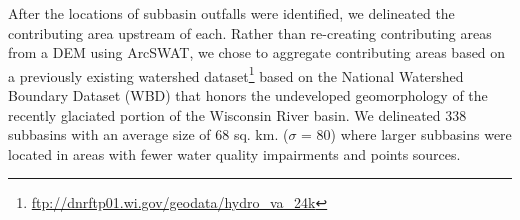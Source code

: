 After the locations of subbasin outfalls were identified, we delineated the contributing area upstream of each.
Rather than re-creating contributing areas from a DEM using ArcSWAT, we chose to aggregate contributing areas based on a previously existing watershed dataset\footnote{\url{ftp://dnrftp01.wi.gov/geodata/hydro_va_24k}} based on the National Watershed Boundary Dataset (WBD) that honors the undeveloped geomorphology of the recently glaciated portion of the Wisconsin River basin.
We delineated 338 subbasins with an average size of 68 sq. km. ($\sigma$ = 80) where larger subbasins were located in areas with fewer water quality impairments and points sources.